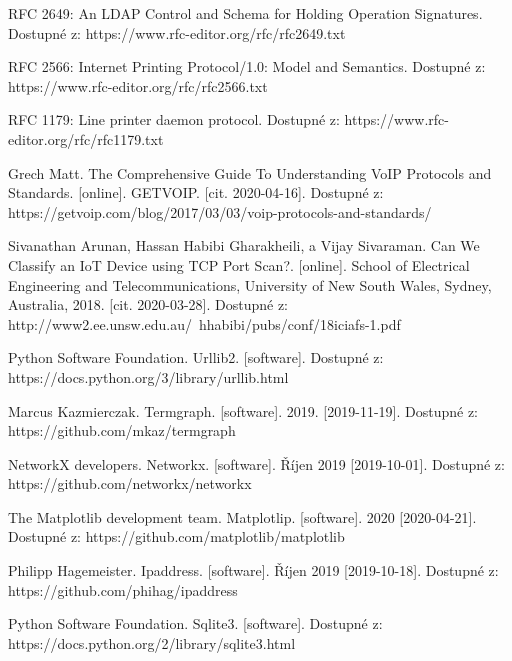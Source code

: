 \documentclass[thesis=B,czech,hidelinks]{FITthesis}[2019/03/21]
\begin{document}
\begin{thebibliography}{99}
    
     RFC 2649: An LDAP Control and Schema for Holding Operation Signatures. Dostupné
z: https://www.rfc-editor.org/rfc/rfc2649.txt

    
      RFC 2566: Internet Printing Protocol/1.0: Model and Semantics. Dostupné
z: https://www.rfc-editor.org/rfc/rfc2566.txt
    
      RFC 1179: Line printer daemon protocol. Dostupné
z: https://www.rfc-editor.org/rfc/rfc1179.txt
    
    
      Grech Matt. The Comprehensive Guide To Understanding VoIP Protocols and Standards. [online]. GETVOIP. [cit. 2020-04-16]. Dostupné z: https://getvoip.com/blog/2017/03/03/voip-protocols-and-standards/
    
     Sivanathan Arunan, Hassan Habibi Gharakheili, a Vijay Sivaraman. Can We Classify an IoT Device using TCP Port Scan?. [online]. School of Electrical Engineering and Telecommunications, University of New South Wales, Sydney, Australia, 2018. [cit. 2020-03-28]. Dostupné z: http://www2.ee.unsw.edu.au/~hhabibi/pubs/conf/18iciafs-1.pdf

     Python Software Foundation. Urllib2. [software]. Dostupné z: https://docs.python.org/3/library/urllib.html
    
     Marcus Kazmierczak. Termgraph. [software]. 2019. [2019-11-19]. Dostupné z: https://github.com/mkaz/termgraph
    
     NetworkX developers. Networkx. [software]. Říjen 2019 [2019-10-01]. Dostupné z: https://github.com/networkx/networkx
    
      The Matplotlib development team. Matplotlip. [software]. 2020 [2020-04-21]. Dostupné z: https://github.com/matplotlib/matplotlib
    
     Philipp Hagemeister. Ipaddress. [software]. Říjen 2019 [2019-10-18]. Dostupné z: https://github.com/phihag/ipaddress
    
     Python Software Foundation. Sqlite3. [software]. Dostupné z: https://docs.python.org/2/library/sqlite3.html
    

\end{thebibliography}

\appendix
\end{document}
